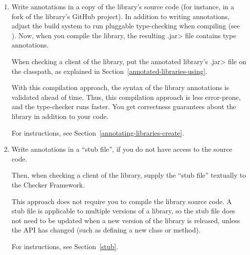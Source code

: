 \begin{enumerate}
\item
  Write annotations in a copy of the library's source code (for instance,
  in a fork of the library's GitHub project).  In addition to writing
  annotations, adjust the build system to run pluggable type-checking when
  compiling (see ).  Now, when you compile
  the library, the resulting \<.jar> file contains type annotations.

  When checking a client of the library,
  put the annotated library's \<.jar> file on the classpath, as explained in
  Section~\ref{annotated-libraries-using}.


  With this compilation approach, the syntax of the library annotations is
  validated ahead of time.  Thus, this compilation approach is less
  error-prone, and the type-checker runs faster.  You get
  correctness guarantees about the library in addition to your code.

  For instructions, see Section~\ref{annotating-libraries-create}.

\item
  Write annotations in a ``stub file'', if you do not have access to the
  source code.

  Then, when checking a client of the library,
  supply the ``stub file'' textually to the Checker Framework.

  This approach does not require you to compile the library source
  code.
  A stub file is applicable to multiple versions of a library, so
  the stub file does not need to be updated when a new version of the
  library is released, unless the API has changed (such as defining a new
  class or method).

  For instructions, see Section~\ref{stub}.

\end{enumerate}


